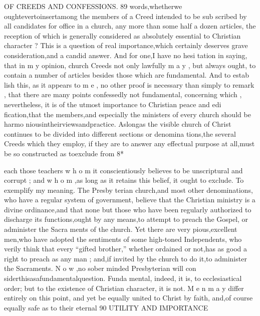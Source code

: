 \documentclass[
]{book}
\begin{document}
OF CREEDS AND CONFESSIONS. 89
words,whetherwe oughtevertoinsertamong the members of a Creed intended to be sub
scribed by all candidates for office in a church, any more than some half a dozen articles, the reception of which is generally considered as absolutely essential to Christian character ?
This is a question of real importance,which
certainly deserves grave consideration,and a candid answer. And for one,I have no hesi
tation in saying, that in m y opinion, church Creeds not only lawfully m a y , but always ought, to contain a number of articles besides those which are fundamental. And to estab
lish this, as it appears to m e , no other proof is necessary than simply to remark , that there
are many points confessedly not fundamental,
concerning which , nevertheless, it is of the
utmost importance to Christian peace and edi
fication,that the members,and especially the ministers of every church should be harmo
niousintheirviewsandpractice. Aslongas the visible church of Christ continues to be
divided into different sections or denomina
tions,the several Creeds which they employ, if they are to answer any effectual purpose at all,must be so constructed as toexclude from
8*

each those teachers w h o m it conscientiously
believes to be unscriptural and corrupt ; and
w h o m ,as long as it retains this belief, it ought to exclude.
To exemplify my meaning. The Presby terian church,and most other denominations, who have a regular system of government, believe that the Christian ministry is a divine ordinance,and that none but those who have
been regularly authorized to discharge its functions,ought by any means,to attempt to preach the Gospel, or administer the Sacra ments of the church. Yet there are very pious,excellent men,who have adopted the sentiments of some high-toned Independents, who verily think that every ``gifted brother,'' whether ordained or not,has as good a right to preach as any man ; and,if invited by the church to do it,to administer the Sacraments. N o w ,no sober minded Presbyterian will con siderthisasafundamentalquestion. Funda mental, indeed, it is, to ecclesiastical order; but to the existence of Christian character, it is not. M e n m a y differ entirely on this point, and yet be equally united to Christ by faith, and,of course equally safe as to their eternal
90 UTILITY AND IMPORTANCE
\end{document}
